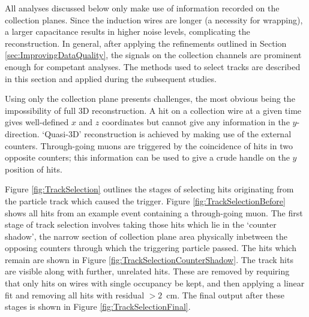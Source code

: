 All analyses discussed below only make use of information recorded on the collection planes.  Since the induction wires are longer (a necessity for wrapping), a larger capacitance results in higher noise levels, complicating the reconstruction.  In general, after applying the refinements outlined in Section \ref{sec:ImprovingDataQuality}, the signals on the collection channels are prominent enough for competant analyses.  The methods used to select tracks are described in this section and applied during the subsequent studies.

Using only the collection plane presents challenges, the most obvious being the impossibility of full 3D reconstruction.  A hit on a collection wire at a given time gives well-defined $x$ and $z$ coordinates but cannot give any information in the $y$-direction.  `Quasi-3D' reconstruction is achieved by making use of the external counters.  Through-going muons are triggered by the coincidence of hits in two opposite counters; this information can be used to give a crude handle on the $y$ position of hits.

Figure \ref{fig:TrackSelection} outlines the stages of selecting hits originating from the particle track which caused the trigger.  Figure \ref{fig:TrackSelectionBefore} shows all hits from an example event containing a through-going muon.  The first stage of track selection involves taking those hits which lie in the `counter shadow', the narrow section of collection plane area physically inbetween the opposing counters through which the triggering particle passed.  The hits which remain are shown in Figure \ref{fig:TrackSelectionCounterShadow}.  The track hits are visible along with further, unrelated hits.  These are removed by requiring that only hits on wires with single occupancy be kept, and then applying a linear fit and removing all hits with residual $>2$~cm.  The final output after these stages is shown in Figure \ref{fig:TrackSelectionFinal}.

